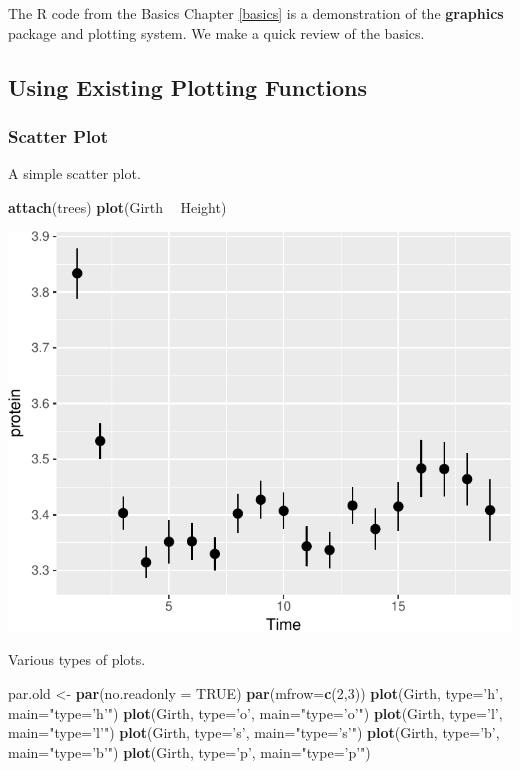 \documentclass[]{book}
\newenvironment{Shaded}{\begin{snugshade}}{\end{snugshade}}
\newcommand{\KeywordTok}[1]{\textcolor[rgb]{0.13,0.29,0.53}{\textbf{#1}}}
\newcommand{\DataTypeTok}[1]{\textcolor[rgb]{0.13,0.29,0.53}{#1}}
\newcommand{\DecValTok}[1]{\textcolor[rgb]{0.00,0.00,0.81}{#1}}
\newcommand{\StringTok}[1]{\textcolor[rgb]{0.31,0.60,0.02}{#1}}
\newcommand{\OtherTok}[1]{\textcolor[rgb]{0.56,0.35,0.01}{#1}}
\newcommand{\OperatorTok}[1]{\textcolor[rgb]{0.81,0.36,0.00}{\textbf{#1}}}
\newcommand{\NormalTok}[1]{#1}
\theoremstyle{definition}
\theoremstyle{definition}
\theoremstyle{definition}
\theoremstyle{remark}
\begin{document}
The R code from the Basics Chapter \ref{basics} is a demonstration of
the \textbf{graphics} package and plotting system. We make a quick
review of the basics.

\subsection{Using Existing Plotting
Functions}\label{using-existing-plotting-functions}

\subsubsection{Scatter Plot}\label{scatter-plot}

A simple scatter plot.

\begin{Shaded}
\begin{Highlighting}[]
\KeywordTok{attach}\NormalTok{(trees)}
\KeywordTok{plot}\NormalTok{(Girth }\OperatorTok{~}\StringTok{ }\NormalTok{Height)}
\end{Highlighting}
\end{Shaded}

\includegraphics[width=0.5\linewidth]{Rcourse_files/figure-latex/unnamed-chunk-242-1}

Various types of plots.

\begin{Shaded}
\begin{Highlighting}[]
\NormalTok{par.old <-}\StringTok{ }\KeywordTok{par}\NormalTok{(}\DataTypeTok{no.readonly =} \OtherTok{TRUE}\NormalTok{)}
\KeywordTok{par}\NormalTok{(}\DataTypeTok{mfrow=}\KeywordTok{c}\NormalTok{(}\DecValTok{2}\NormalTok{,}\DecValTok{3}\NormalTok{))}
\KeywordTok{plot}\NormalTok{(Girth, }\DataTypeTok{type=}\StringTok{'h'}\NormalTok{, }\DataTypeTok{main=}\StringTok{"type='h'"}\NormalTok{) }
\KeywordTok{plot}\NormalTok{(Girth, }\DataTypeTok{type=}\StringTok{'o'}\NormalTok{, }\DataTypeTok{main=}\StringTok{"type='o'"}\NormalTok{) }
\KeywordTok{plot}\NormalTok{(Girth, }\DataTypeTok{type=}\StringTok{'l'}\NormalTok{, }\DataTypeTok{main=}\StringTok{"type='l'"}\NormalTok{)}
\KeywordTok{plot}\NormalTok{(Girth, }\DataTypeTok{type=}\StringTok{'s'}\NormalTok{, }\DataTypeTok{main=}\StringTok{"type='s'"}\NormalTok{)}
\KeywordTok{plot}\NormalTok{(Girth, }\DataTypeTok{type=}\StringTok{'b'}\NormalTok{, }\DataTypeTok{main=}\StringTok{"type='b'"}\NormalTok{)}
\KeywordTok{plot}\NormalTok{(Girth, }\DataTypeTok{type=}\StringTok{'p'}\NormalTok{, }\DataTypeTok{main=}\StringTok{"type='p'"}\NormalTok{)}
\end{Highlighting}
\end{Shaded}
\end{document}
